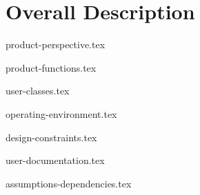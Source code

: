 \chapter{Overall Description} \label{chap:overalldescription}

{product-perspective.tex}

\newpage
{product-functions.tex}

\newpage
{user-classes.tex}

\newpage
{operating-environment.tex}

\newpage
{design-constraints.tex}

\newpage
{user-documentation.tex}

\newpage
{assumptions-dependencies.tex}
